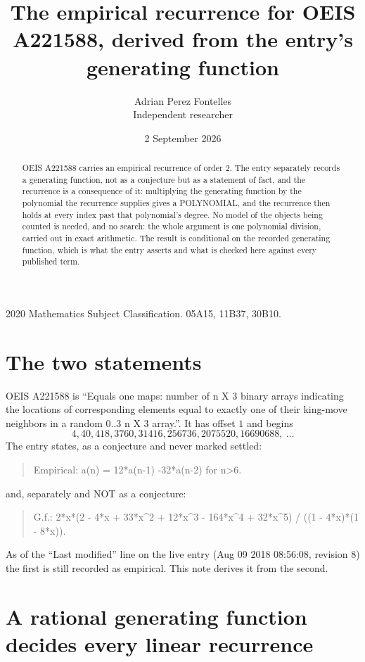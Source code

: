 \documentclass[11pt,a4paper]{article}
\title{The empirical recurrence for OEIS A221588, derived from the entry's generating function}
\author{Adrian Perez Fontelles\\ \small Independent researcher}
\date{2 September 2026}
\theoremstyle{plain}
\theoremstyle{definition}
\begin{document}
\maketitle

\begin{abstract}
OEIS A221588 carries an empirical recurrence of order $2$. The entry separately records a
generating function, not as a conjecture but as a statement of fact, and the recurrence is a
consequence of it: multiplying the generating function by the polynomial the recurrence
supplies gives a POLYNOMIAL, and the recurrence then holds at every index past that
polynomial's degree. No model of the objects being counted is needed, and no search: the
whole argument is one polynomial division, carried out in exact arithmetic. The result is
conditional on the recorded generating function, which is what the entry asserts and what is
checked here against every published term.
\end{abstract}

\noindent\small 2020 Mathematics Subject Classification. 05A15, 11B37, 30B10.\normalsize

\section{The two statements}

OEIS A221588 is ``Equals one maps: number of n X 3 binary arrays indicating the locations of corresponding elements equal to exactly one of their king-move neighbors in a random 0..3 n X 3 array.''. It has offset $1$ and begins
\[
4, 40, 418, 3760, 31416, 256736, 2075520, 16690688,\ \dots
\]
The entry states, as a conjecture and never marked settled:
\begin{quote}
Empirical: a(n) = 12*a(n-1) -32*a(n-2) for n>6.
\end{quote}
and, separately and NOT as a conjecture:
\begin{quote}
G.f.: 2*x*(2 - 4*x + 33*x\^{}2 + 12*x\^{}3 - 164*x\^{}4 + 32*x\^{}5) / ((1 - 4*x)*(1 - 8*x)).
\end{quote}
As of the ``Last modified'' line on the live entry (Aug 09 2018 08:56:08, revision 8) the first is still
recorded as empirical. This note derives it from the second.

\section{A rational generating function decides every linear recurrence}
\end{document}

